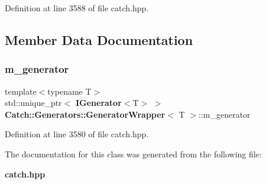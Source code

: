 Definition at line 3588 of file catch.\+hpp.



\subsection{Member Data Documentation}
\mbox{\label{class_catch_1_1_generators_1_1_generator_wrapper_a8f35291599183b36e4c5af78e17d3a8c}} 
\subsubsection{m\_generator}
{\footnotesize\ttfamily template$<$typename T$>$ \\
std\+::unique\+\_\+ptr$<$\textbf{ I\+Generator}$<$T$>$ $>$ \textbf{ Catch\+::\+Generators\+::\+Generator\+Wrapper}$<$ T $>$\+::m\+\_\+generator\hspace{0.3cm}{\ttfamily [private]}}



Definition at line 3580 of file catch.\+hpp.



The documentation for this class was generated from the following file\+:\begin{DoxyCompactItemize}
\item 
\textbf{ catch.\+hpp}\end{DoxyCompactItemize}
